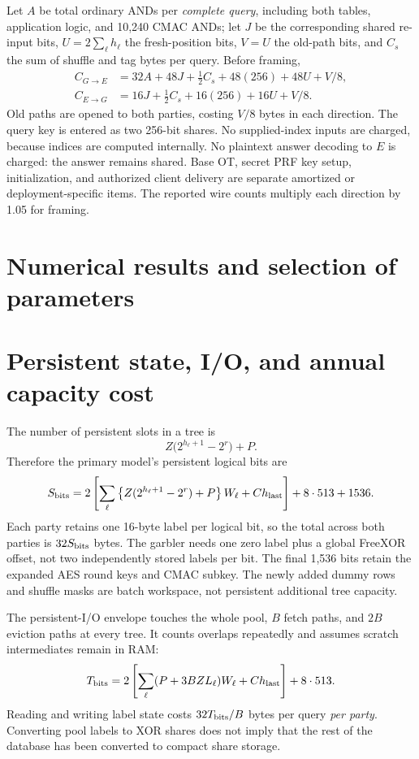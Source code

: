 \documentclass[11pt]{article}
\begin{document}
Let $A$ be total ordinary ANDs per \emph{complete query}, including both
tables, application logic, and 10,240 CMAC ANDs; let $J$ be the corresponding
shared re-input bits, $U=2\sum_\ell h_\ell$ the fresh-position bits, $V=U$
the old-path bits, and $C_s$ the sum of shuffle and tag bytes per query.
Before framing,
\begin{align}
 C_{G\to E}&=32A+48J+\tfrac12C_s+48(256)+48U+V/8,\\
 C_{E\to G}&=16J+\tfrac12C_s+16(256)+16U+V/8.
\label{eq:wire}
\end{align}
Old paths are opened to both parties, costing $V/8$ bytes in each direction.
The query key is entered as two 256-bit shares. No supplied-index inputs are
charged, because indices are computed internally. No plaintext answer
decoding to $E$ is charged: the answer remains shared. Base OT, secret PRF
key setup, initialization, and authorized client delivery are separate
amortized or deployment-specific items. The reported wire counts multiply
each direction by 1.05 for framing.

\section{Numerical results and selection of parameters}
\label{sec:results}


\section{Persistent state, I/O, and annual capacity cost}
\label{sec:deployment}
The number of persistent slots in a tree is
\begin{equation}
 Z\bigl(2^{h_\ell+1}-2^r\bigr)+P.
\end{equation}
Therefore the primary model's persistent logical bits are
\begin{equation}
 S_{\rm bits}=2\left[\sum_\ell
 \left\{Z(2^{h_\ell+1}-2^r)+P\right\}W_\ell+C h_{\rm last}\right]
 +8\cdot513+1536.
\end{equation}
Each party retains one 16-byte label per logical bit, so the total across
both parties is $32S_{\rm bits}$ bytes. The garbler needs one zero label plus
a global FreeXOR offset, not two independently stored labels per bit.
The final 1,536 bits retain the expanded AES round keys and CMAC subkey.
The newly added dummy rows and shuffle masks are batch workspace, not
persistent additional tree capacity.

The persistent-I/O envelope touches the whole pool, $B$ fetch paths, and
$2B$ eviction paths at every tree. It counts overlaps repeatedly and assumes
scratch intermediates remain in RAM:
\begin{equation}
 T_{\rm bits}=2\left[\sum_\ell(P+3BZL_\ell)W_\ell+C h_{\rm last}\right]
            +8\cdot513.
\end{equation}
Reading and writing label state costs $32T_{\rm bits}/B$ bytes per query
\emph{per party}. Converting pool labels to XOR shares does not imply that
the rest of the database has been converted to compact share storage.
\end{document}
